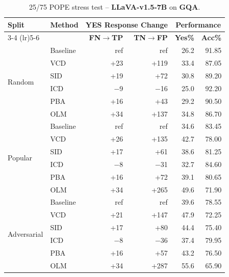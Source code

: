 \documentclass[11pt]{article}
\begin{document}
\begin{table}[ht]
\centering
\caption{25/75 POPE stress test -- \textbf{LLaVA-v1.5-7B} on \textbf{GQA}.}
\label{tab:25_75_llava_gqa}
\setlength{\tabcolsep}{6pt}
\renewcommand{\arraystretch}{1.1}
\begin{tabular}{l|l|rr|rr}
\toprule
\multirow{2}{*}{\textbf{Split}} &
\multirow{2}{*}{\textbf{Method}} &
\multicolumn{2}{c|}{\textbf{YES Response Change}} &
\multicolumn{2}{c}{\textbf{Performance}} \\
\cmidrule(lr){3-4} \cmidrule(lr){5-6}
& & \textbf{FN$\to$TP} & \textbf{TN$\to$FP} & \textbf{Yes\%} & \textbf{Acc\%} \\
\midrule

\multirow{6}{*}{Random}
& Baseline & ref   & ref   & 26.2 & 91.85 \\
& VCD      & +23   & +119  & 33.4 & 87.05 \\
& SID      & +19   & +72   & 30.8 & 89.20 \\
& ICD      & $-$9  & $-$16 & 25.0 & 92.20 \\
& PBA      & +16   & +43   & 29.2 & 90.50 \\
& OLM      & +34   & +137  & 34.8 & 86.70 \\
\midrule

\multirow{6}{*}{Popular}
& Baseline & ref   & ref   & 34.6 & 83.45 \\
& VCD      & +26   & +135  & 42.7 & 78.00 \\
& SID      & +17   & +61   & 38.6 & 81.25 \\
& ICD      & $-$8  & $-$31 & 32.7 & 84.60 \\
& PBA      & +16   & +72   & 39.1 & 80.65 \\
& OLM      & +34   & +265  & 49.6 & 71.90 \\
\midrule

\multirow{6}{*}{Adversarial}
& Baseline & ref   & ref   & 39.6 & 78.55 \\
& VCD      & +21   & +147  & 47.9 & 72.25 \\
& SID      & +17   & +80   & 44.4 & 75.40 \\
& ICD      & $-$8  & $-$36 & 37.4 & 79.95 \\
& PBA      & +16   & +57   & 43.2 & 76.50 \\
& OLM      & +34   & +287  & 55.6 & 65.90 \\
\bottomrule
\end{tabular}
\end{table}

\end{document}
